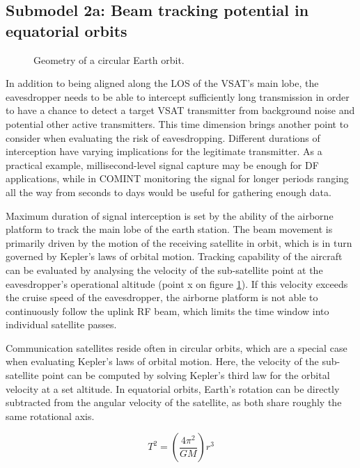 \documentclass[english, 12pt, a4paper, elec, utf8, a-1b, online]{aaltothesis}
\begin{document}
\subsection{Submodel 2a: Beam tracking potential in equatorial orbits} \label{ch-results-submodel-2a-tracking-equatorial}

\begin{figure}[h]
  \centering
  
  \caption{Geometry of a circular Earth orbit.}
  \label{fig-orbit-geometry}
\end{figure}

In addition to being aligned along the LOS of the VSAT's main lobe, the eavesdropper needs to be able to intercept sufficiently long transmission in order to have a chance to detect a target VSAT transmitter from background noise and potential other active transmitters.
This time dimension brings another point to consider when evaluating the risk of eavesdropping.
Different durations of interception have varying implications for the legitimate transmitter.
As a practical example, millisecond-level signal capture may be enough for DF applications, while in COMINT monitoring the signal for longer periods ranging all the way from seconds to days would be useful for gathering enough data. %

Maximum duration of signal interception is set by the ability of the airborne platform to track the main lobe of the earth station.
The beam movement is primarily driven by the motion of the receiving satellite in orbit, which is in turn governed by Kepler's laws of orbital motion.
Tracking capability of the aircraft can be evaluated by analysing the velocity of the sub-satellite point at the eavesdropper's operational altitude (point x on figure \ref{fig-orbit-geometry}).
If this velocity exceeds the cruise speed of the eavesdropper, the airborne platform is not able to continuously follow the uplink RF beam, which limits the time window into individual satellite passes.

Communication satellites reside often in circular orbits, which are a special case when evaluating Kepler's laws of orbital motion.
Here, the velocity of the sub-satellite point can be computed by solving Kepler's third law for the orbital velocity at a set altitude.
In equatorial orbits, Earth's rotation can be directly subtracted from the angular velocity of the satellite, as both share roughly the same rotational axis.

\begin{equation} \label{eq-kepler-3}
  T^2 = (\frac{4\pi^2}{GM})r^3
\end{equation}
\end{document}
